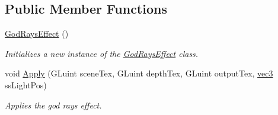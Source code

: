\subsection*{Public Member Functions}
\begin{DoxyCompactItemize}
\item 
\hyperlink{class_god_rays_effect_aa6e3d593e4aa1f8e4c1fa6dfb81f1d02}{God\+Rays\+Effect} ()
\begin{DoxyCompactList}\small\item\em Initializes a new instance of the \hyperlink{class_god_rays_effect}{God\+Rays\+Effect} class. \end{DoxyCompactList}\item 
void \hyperlink{class_god_rays_effect_a72ed46eb69228e3d62c6cbd924fc9943}{Apply} (G\+Luint scene\+Tex, G\+Luint depth\+Tex, G\+Luint output\+Tex, \hyperlink{_types_8h_a3d0ce73e3199de81565fb01632415288}{vec3} ss\+Light\+Pos)
\begin{DoxyCompactList}\small\item\em Applies the god rays effect. \end{DoxyCompactList}\end{DoxyCompactItemize}
